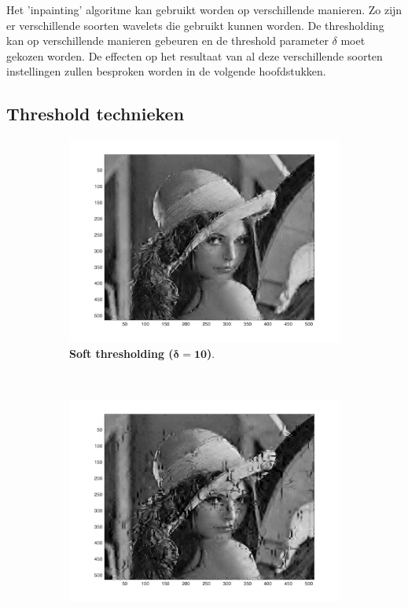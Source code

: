 
Het 'inpainting' algoritme kan gebruikt worden op verschillende manieren. Zo zijn er verschillende soorten wavelets die gebruikt kunnen worden. De thresholding kan op verschillende manieren gebeuren en de threshold parameter $\delta$ moet gekozen worden. De effecten op het resultaat van al deze verschillende soorten instellingen zullen besproken worden in de volgende hoofdstukken.



\subsection{Threshold technieken}

\begin{figure}[!]
    \centering
    \begin{subfigure}[b]{0.45\textwidth}
        \includegraphics[width=\textwidth]{../src/inpainting/lena_soft_2}
        \caption{ \textbf{Soft thresholding ($\mathbf{\delta = 10 }$)}.}
        \label{fig:matti_soft_2}
    \end{subfigure}
    ~ %
    \begin{subfigure}[b]{0.45\textwidth}
        \includegraphics[width=\textwidth]{../src/inpainting/lena_hard_2}

\end{subfigure}
\end{figure}
